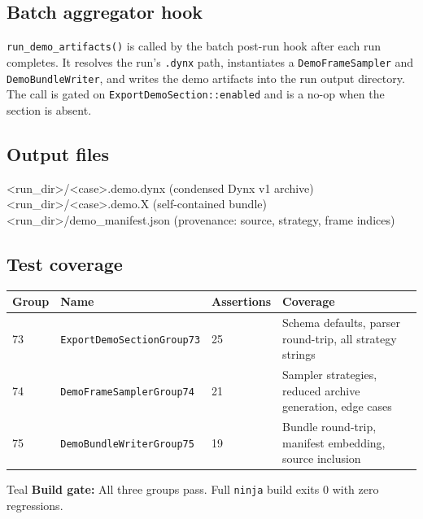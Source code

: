 ﻿\documentclass[11pt,a4paper]{article}
\begin{document}
\subsection*{Batch aggregator hook}

\texttt{run\_demo\_artifacts()} is called by the batch post-run hook after each run completes.
It resolves the run's \texttt{.dynx} path, instantiates a \texttt{DemoFrameSampler} and
\texttt{DemoBundleWriter}, and writes the demo artifacts into the run output directory.
The call is gated on \texttt{ExportDemoSection::enabled} and is a no-op when the section is absent.

\subsection*{Output files}
\begin{codebox}
<run_dir>/<case>.demo.dynx         (condensed Dynx v1 archive)
<run_dir>/<case>.demo.X            (self-contained bundle)
<run_dir>/demo_manifest.json       (provenance: source, strategy, frame indices)
\end{codebox}

\subsection*{Test coverage}

\begin{center}
\begin{tabularx}{\linewidth}{@{}lllX@{}}
\toprule
\textbf{Group} & \textbf{Name} & \textbf{Assertions} & \textbf{Coverage} \\
\midrule
73 & \texttt{ExportDemoSectionGroup73} & 25 & Schema defaults, parser round-trip, all strategy strings \\
74 & \texttt{DemoFrameSamplerGroup74}  & 21 & Sampler strategies, reduced archive generation, edge cases \\
75 & \texttt{DemoBundleWriterGroup75}  & 19 & Bundle round-trip, manifest embedding, source inclusion \\
\bottomrule
\end{tabularx}
\end{center}

\begin{notebox}{Teal}
\textbf{Build gate:} All three groups pass.
Full \texttt{ninja} build exits 0 with zero regressions.
\end{notebox}

\newpage
\end{document}
